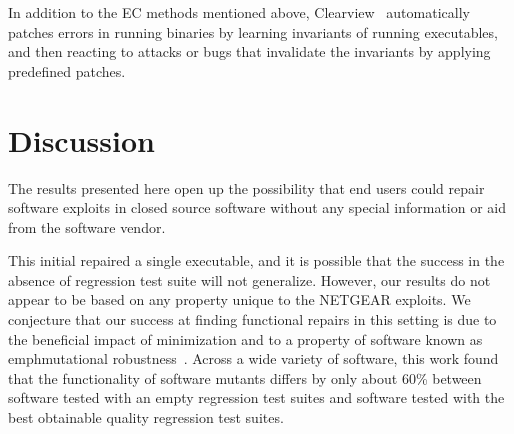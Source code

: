 \documentclass{sigcomm-alternate}
\begin{document}

In addition to the EC methods mentioned above, Clearview~\cite{clearview}
automatically patches errors in running binaries by learning
invariants of running executables, and then reacting to attacks or
bugs that invalidate the invariants by applying predefined patches.

\section{Discussion}


The results presented here open up the possibility that end users
could repair software exploits in closed source software without any
special information or aid from the software vendor.

This initial repaired a single executable, and it is possible that the
success in the absence of regression test suite will not generalize.
However, our results do not appear to be based on any property unique
to the NETGEAR exploits.  We conjecture that our success at finding
functional repairs in this setting is due to the beneficial impact of
minimization and to a property of software known as \\emph{mutational
  robustness}~\cite{schulte2013software}.  Across a wide variety of
software, this work found that the functionality of software mutants
differs by only about 60\% between software tested with an empty
regression test suites and software tested with the best obtainable
quality regression test suites.
\end{document}
